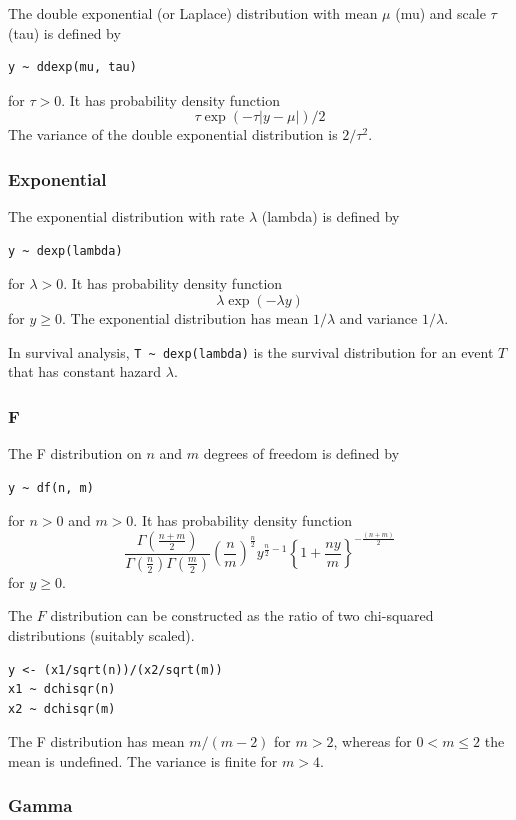 \documentclass[11pt, a4paper, titlepage]{report}
\begin{document}
The double exponential (or Laplace) distribution with mean $\mu$ (mu) and
scale $\tau$ (tau) is defined by
\begin{verbatim}
y ~ ddexp(mu, tau)
\end{verbatim}
for $\tau > 0$. It has probability density function
\[
\tau \exp(-\tau | y - \mu |)/2
\]
The variance of the double exponential distribution is $2/\tau^2$.

\subsubsection{Exponential}
\label{bugs:dexp}

The exponential distribution with rate $\lambda$ (lambda) is defined by
\begin{verbatim}
y ~ dexp(lambda)
\end{verbatim}
for $\lambda > 0$. It has probability density function
\[
\lambda \exp(-\lambda y)
\]
for $y \geq 0$. The exponential distribution has mean $1/\lambda$ and
variance $1/\lambda$.

In survival analysis, \verb+T ~ dexp(lambda)+ is the survival distribution
for an event $T$ that has constant hazard $\lambda$.

\subsubsection{F}
\label{bugs:df}

The F distribution on $n$ and $m$ degrees of freedom is defined by
\begin{verbatim}
y ~ df(n, m)
\end{verbatim}
for $n > 0$ and $m > 0$. It has probability density function
\[
\frac{\Gamma(\frac{n + m}{2})}
     {\Gamma(\frac{n}{2}) \Gamma(\frac{m}{2})}
     \left(\frac{n}{m} \right)^{\frac{n}{2}} y^{\frac{n}{2} - 1} 
     \left\{1 + \frac{ny}{m} \right\}^{-\frac{(n + m)}{2}}
\]
for $y \geq 0$.       

The $F$ distribution can be constructed as the ratio of two chi-squared
distributions (suitably scaled).
\begin{verbatim}
y <- (x1/sqrt(n))/(x2/sqrt(m))
x1 ~ dchisqr(n)
x2 ~ dchisqr(m)
\end{verbatim}
The F distribution has mean $m/(m-2)$ for $m > 2$, whereas for $0 < m \leq 2$
the mean is undefined. The variance is finite for $m > 4$.

\subsubsection{Gamma}
\label{bugs:dgamma}
\end{document}
